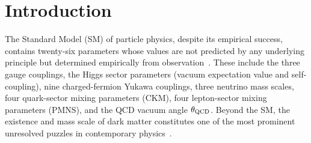 ﻿\documentclass[reprint,amsmath,amssymb,aps,prd,longbibliography,floatfix]{revtex4-2}
\begin{document}
\fi

\maketitle

\tableofcontents

\section{Introduction}
\label{sec:intro}

The Standard Model (SM) of particle physics, despite its empirical
success, contains twenty-six parameters whose values are not predicted
by any underlying principle but determined empirically from
observation~\cite{PDG2024}. These include the three gauge couplings,
the Higgs sector parameters (vacuum expectation value and self-coupling),
nine charged-fermion Yukawa couplings, three neutrino mass scales, four
quark-sector mixing parameters (CKM), four lepton-sector mixing
parameters (PMNS), and the QCD vacuum angle $\theta_{\rm QCD}$. Beyond
the SM, the existence and mass scale of dark matter constitutes one of
the most prominent unresolved puzzles in contemporary
physics~\cite{Bertone2018}.
\end{document}
